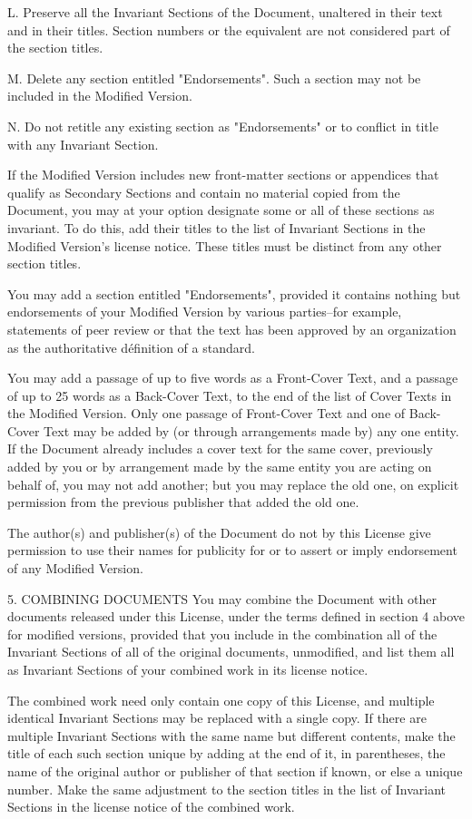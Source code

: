 L. Preserve all the Invariant Sections of the Document, unaltered in their text and in their titles. Section numbers or the equivalent are not considered part of the section titles.

M. Delete any section entitled "Endorsements". Such a section may not be included in the Modified Version.

N. Do not retitle any existing section as "Endorsements" or to conflict in title with any Invariant Section.

If the Modified Version includes new front-matter sections or appendices that qualify as Secondary Sections and contain no material copied from the Document, you may at your option designate some or all of these sections as invariant. To do this, add their titles to the list of Invariant Sections in the Modified Version's license notice. These titles must be distinct from any other section titles.

You may add a section entitled "Endorsements", provided it contains nothing but endorsements of your Modified Version by various parties--for example, statements of peer review or that the text has been approved by an organization as the authoritative définition of a standard.

You may add a passage of up to five words as a Front-Cover Text, and a passage of up to 25 words as a Back-Cover Text, to the end of the list of Cover Texts in the Modified Version. Only one passage of Front-Cover Text and one of Back-Cover Text may be added by (or through arrangements made by) any one entity. If the Document already includes a cover text for the same cover, previously added by you or by arrangement made by the same entity you are acting on behalf of, you may not add another; but you may replace the old one, on explicit permission from the previous publisher that added the old one.

The author(s) and publisher(s) of the Document do not by this License give permission to use their names for publicity for or to assert or imply endorsement of any Modified Version.

5. COMBINING DOCUMENTS
You may combine the Document with other documents released under this License, under the terms defined in section 4 above for modified versions, provided that you include in the combination all of the Invariant Sections of all of the original documents, unmodified, and list them all as Invariant Sections of your combined work in its license notice.

The combined work need only contain one copy of this License, and multiple identical Invariant Sections may be replaced with a single copy. If there are multiple Invariant Sections with the same name but different contents, make the title of each such section unique by adding at the end of it, in parentheses, the name of the original author or publisher of that section if known, or else a unique number. Make the same adjustment to the section titles in the list of Invariant Sections in the license notice of the combined work.

